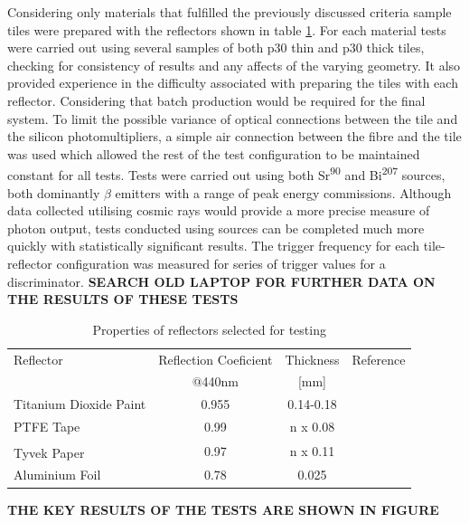 Considering only materials that fulfilled the previously discussed criteria sample tiles were prepared with the reflectors shown in table \ref{ReflMatProp}. For each material tests were carried out using several samples of both p30 thin and p30 thick tiles, checking for consistency of results and any affects of the varying geometry. It also provided experience in the difficulty associated with preparing the tiles with each reflector. Considering that batch production would be required for the final system. To limit the possible variance of optical connections between the tile and the silicon photomultipliers, a simple air connection between the fibre and the tile was used which allowed the rest of the test configuration to be maintained constant for all tests. Tests were carried out using both Sr\textsuperscript{90} and Bi\textsuperscript{207} sources, both dominantly $\beta$ emitters with a range of peak energy commissions. Although data collected utilising cosmic rays would provide a more precise measure of photon output, tests conducted using sources can be completed much more quickly with statistically significant results. The trigger frequency for each tile-reflector configuration was measured for series of trigger values for a discriminator. \textbf{SEARCH OLD LAPTOP FOR FURTHER DATA ON THE RESULTS OF THESE TESTS}


	\begin{table}\centering
	\renewcommand{\arraystretch}{1.3}
	\begin{tabular}{ @{}l  c  c  c@{}} 
		\toprule
		Reflector & Reflection Coeficient & Thickness & Reference \\
		& {\small @440nm}& {\small [mm]}&  \\
		\midrule
		Titanium Dioxide Paint & 0.955 & 0.14-0.18 & \cite{janecek2012reflectivity}\\
		PTFE Tape & 0.99 & n x 0.08 &\cite{janecek2012reflectivity}\\
		Tyvek\textsuperscript{\textregistered} Paper & 0.97 & n x 0.11 & \cite{janecek2008optical} \\
		Aluminium Foil & 0.78 & 0.025 & \cite{janecek2008optical}\\
		\bottomrule
	\end{tabular}
	\caption{Properties of reflectors selected for testing}
	\label{ReflMatProp}
	\end{table}

\textbf{THE KEY RESULTS OF THE TESTS ARE SHOWN IN FIGURE}

